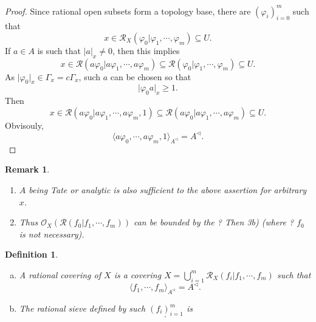\documentclass[8pt]{article}
\numberwithin{equation}{section}
\newtheorem{definition}{Definition}[subsection]
\newtheorem{remark}{Remark}[subsection]
\newcommand{\Ouv}{\mathscr{O}}
\newcommand{\cR}[0]{\mathcal{R}}
\newcommand{\sep}[0]{\:|\:}
\newcommand{\ab}[1]{\vert #1 \vert}
\newcommand{\cGamma}[0]{c\Gamma}
\begin{document}
\begin{proof}
    Since rational open subsets form a topology base, there are $(\varphi_i)_{i=0}^m$ such that 
    \begin{equation*}
        x\in\cR_X(\varphi_0|\varphi_1,\cdots,\varphi_m)\subseteq U.
    \end{equation*}
    If $a\in A$ is such that $\ab{a}_x\not=0$, then this implies
    \begin{equation*}
        x\in\cR(a\varphi_0|a\varphi_1,\cdots,a\varphi_m)\subseteq\cR(\varphi_0|\varphi_1,\cdots,\varphi_m)\subseteq U.
    \end{equation*} 
    As $\ab{\varphi_0}_x\in\Gamma_x = \cGamma_x$, such $a$ can be chosen so that
    \begin{equation*}
        \ab{\varphi_0a}_x\geq 1.
    \end{equation*}
    Then 
    \begin{equation*}
        x\in\cR(a\varphi_0|a\varphi_1,\cdots,a\varphi_m,1)\subseteq\cR(a\varphi_0|a\varphi_1,\cdots,a\varphi_m)\subseteq U.
    \end{equation*}
    Obvisouly,
    \begin{equation*}
        \langle a\varphi_0,\cdots,a\varphi_m,1\rangle_{A^\triangleleft} = A^\triangleleft.
    \end{equation*}
\end{proof}

\begin{remark}$\:$
    \begin{enumerate}
        \item $A$ being Tate or analytic is also sufficient to the above assertion for arbitrary $x$.
        \item Thus $\mathcal{O}_X(\cR(f_0|f_1,\cdots,f_m))$ can be bounded by the ? Then 3b) (where ? $f_0$ is not necessary).
    \end{enumerate}
\end{remark}

\begin{definition}$\:$
    \begin{enumerate}[a.]
        \item A rational covering of $X$ is a covering $X = \bigcup_{i=1}^m\cR_X(f_i|f_1,\cdots,f_m)$ such that 
        \begin{equation*}
            \langle f_1,\cdots,f_m\rangle_{A^\triangleleft} = A^\triangleleft.
        \end{equation*}
        \item The rational sieve defined by such $(f_i)_{i=1}^m$ is 
        \begin{equation*}
            [\mathcal{R}(f_i|f_1,\cdots,f_m)\sep i=1,\cdots,m].
        \end{equation*}
    \end{enumerate}
\end{definition}
\end{document}
